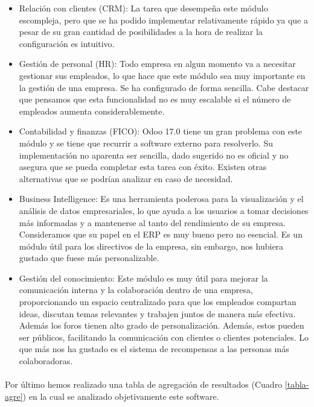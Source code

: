 \begin{itemize}
    \item Relación con clientes (CRM): La tarea que desempeña este módulo escompleja, pero que se ha podido implementar relativamente rápido ya que a pesar de su gran cantidad de posibilidades a la hora de realizar la configuración es intuitivo.
    \item Gestión de personal (HR): Todo empresa en algun momento va a necesitar gestionar sus empleados, lo que hace que este módulo sea muy importante en la gestión de una empresa. Se ha configurado de forma sencilla. Cabe destacar que pensamos que esta funcionalidad no es muy escalable si el número de empleados aumenta considerablemente.
    \item Contabilidad y finanzas (FICO): Odoo 17.0 tiene un gran problema con este módulo y se tiene que recurrir a software externo para resolverlo. Su implementación no aparenta ser sencilla, dado sugerido no es oficial y no asegura que se pueda completar esta tarea con éxito. Existen otras alternativas que se podrían analizar en caso de necesidad.
    \item Business Intelligence: Es una herramienta poderosa para la visualización y el análisis de datos empresariales, lo que ayuda a los usuarios a tomar decisiones más informadas y a mantenerse al tanto del rendimiento de su empresa. Consideramos que su papel en el ERP es muy bueno pero no esencial. Es un módulo útil para los directivos de la empresa, sin embargo, nos hubiera gustado que fuese más personalizable. 
    \item Gestión del conocimiento: Este módulo es muy útil para mejorar la comunicación interna y la colaboración dentro de una empresa, proporcionando un espacio centralizado para que los empleados compartan ideas, discutan temas relevantes y trabajen juntos de manera más efectiva. Además los foros tienen alto grado de personalización. Además, estos pueden ser públicos, facilitando la comunicación con clientes o clientes potenciales. Lo que más nos ha gustado es el sistema de recompensas a las personas más colaboradoras.
\end{itemize}

\paragraph{}
Por último hemos realizado una tabla de agregación de resultados (Cuadro \ref{tabla-agre}) en la cual se analizado objetivamente este software.



